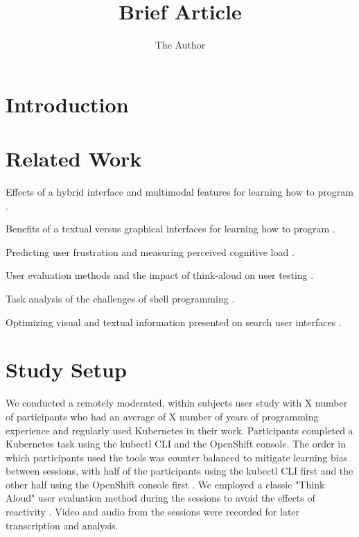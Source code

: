 \documentclass[11pt, oneside]{article}   	%
\title{Brief Article}
\author{The Author}
\begin{document}
\maketitle

\section{Introduction}

\section{Related Work}

Effects of a hybrid interface and multimodal features for learning how to program \cite{unal2021effects, grafsgaard2014additive}.

Benefits of a textual versus graphical interfaces for learning how to program \cite{dillon2012comparing}.

Predicting user frustration and measuring perceived cognitive load \cite{feild2010predicting, hart1988development}.

User evaluation methods and the impact of think-aloud on user testing \cite{mcdonald2020impact, ericsson1984protocol, fox2011procedures}. 

Task analysis of the challenges of shell programming \cite{gandhi2020lightening}.

Optimizing visual and textual information presented on search user interfaces \cite{treharne2012optimising}. 


\section{Study Setup}
We conducted a remotely moderated, within subjects user study with X number of participants who had an average of X number of years of programming experience and regularly used Kubernetes in their work. Participants completed a Kubernetes task using the kubectl CLI and the OpenShift console. The order in which participants used the tools was counter balanced to mitigate learning bias between sessions, with half of the participants using the kubectl CLI first and the other half using the OpenShift console first \cite{}. We employed a classic "Think Aloud" user evaluation method during the sessions to avoid the effects of reactivity \cite{}. Video and audio from the sessions were recorded for later transcription and analysis.
\end{document}
